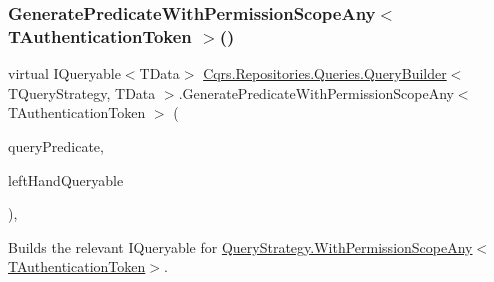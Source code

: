 \subsubsection{\texorpdfstring{Generate\+Predicate\+With\+Permission\+Scope\+Any$<$ T\+Authentication\+Token $>$()}{GeneratePredicateWithPermissionScopeAny< TAuthenticationToken >()}}
{\footnotesize\ttfamily virtual I\+Queryable$<$T\+Data$>$ \hyperlink{classCqrs_1_1Repositories_1_1Queries_1_1QueryBuilder}{Cqrs.\+Repositories.\+Queries.\+Query\+Builder}$<$ T\+Query\+Strategy, T\+Data $>$.Generate\+Predicate\+With\+Permission\+Scope\+Any$<$ T\+Authentication\+Token $>$ (\begin{DoxyParamCaption}\item[{\hyperlink{classCqrs_1_1Repositories_1_1Queries_1_1QueryPredicate}{Query\+Predicate}}]{query\+Predicate,  }\item[{I\+Queryable$<$ T\+Data $>$}]{left\+Hand\+Queryable }\end{DoxyParamCaption})\hspace{0.3cm}{\ttfamily [protected]}, {\ttfamily [virtual]}}



Builds the relevant I\+Queryable for \hyperlink{classCqrs_1_1Repositories_1_1Queries_1_1QueryStrategy_a7fda4380a88972201258bf695ccaf287_a7fda4380a88972201258bf695ccaf287}{Query\+Strategy.\+With\+Permission\+Scope\+Any$<$\+T\+Authentication\+Token$>$}. 

\mbox{\label{classCqrs_1_1Repositories_1_1Queries_1_1QueryBuilder_aa1341909b87629158efa619af12cec5f_aa1341909b87629158efa619af12cec5f}} 

